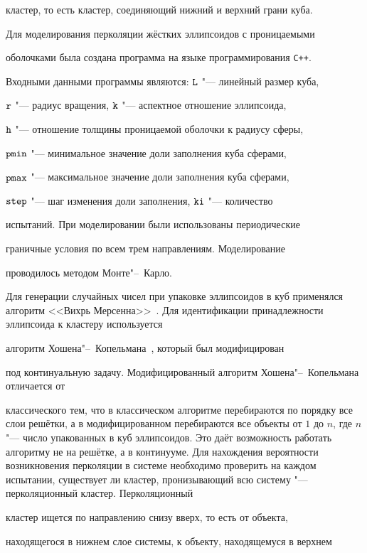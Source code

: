 кластер, то есть кластер, соединяющий нижний и верхний грани куба.



\smallskip




Для моделирования перколяции жёстких эллипсоидов с проницаемыми

оболочками была создана программа на языке программирования {\tt С++}.

Входными данными программы являются: $\tt L$ "---  линейный размер куба,

$\tt r$ "---  радиус вращения, $\tt k$ "---  аспектное отношение эллипсоида,

$\tt h$ "---  отношение толщины проницаемой оболочки к радиусу сферы,

$\tt pmin$ "---  минимальное значение доли заполнения куба сферами,

$\tt pmax$ "---  максимальное значение доли заполнения куба сферами,

$\tt step$ "---  шаг изменения доли заполнения, $\tt ki$ "---  количество

испытаний. При моделировании были использованы периодические

граничные условия по всем трем направлениям. Моделирование

проводилось методом Монте"--~Карло. 

Для генерации случайных чисел при упаковке эллипсоидов в куб применялся алгоритм <<Вихрь Мерсенна>>~\cite{Matsumoto}. Для идентификации принадлежности эллипсоида к кластеру используется

алгоритм Хошена"--~Копельмана~\cite{Hoshen}, который был модифицирован

под континуальную задачу. Модифицированный алгоритм Хошена"--~Копельмана отличается от

классического тем, что в классическом алгоритме перебираются по порядку все слои решётки, а в модифицированном перебираются все объекты от $1$ до $n$, где $n$ "---  число упакованных в куб эллипсоидов. Это даёт возможность работать алгоритму не на решётке, а в континууме. Для нахождения вероятности возникновения перколяции в системе необходимо проверить на каждом испытании, существует ли кластер, пронизывающий всю систему "---  перколяционный кластер. Перколяционный

кластер ищется по направлению снизу вверх, то есть от объекта,

находящегося в нижнем слое системы, к объекту, находящемуся в верхнем

